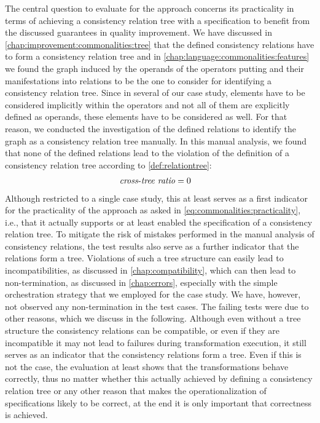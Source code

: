 The central question to evaluate for the \commonalities approach concerns its practicality in terms of achieving a consistency relation tree with a \commonalities specification to benefit from the discussed guarantees in quality improvement.
We have discussed in \autoref{chap:improvement:commonalities:tree} that the defined consistency relations have to form a consistency relation tree and in \autoref{chap:language:commonalities:features} we found the graph induced by the operands of the operators putting \commonalities and their manifestations into relations to be the one to consider for identifying a consistency relation tree.
Since in several \commonalities of our case study, elements have to be considered implicitly within the operators and not all of them are explicitly defined as operands, these elements have to be considered as well.
For that reason, we conducted the investigation of the defined relations to identify the graph as a consistency relation tree manually.
In this manual analysis, we found that none of the defined relations lead to the violation of the definition of a consistency relation tree according to \autoref{def:relationtree}:
\begin{align*}
    &
    \mathit{cross\mbox{-}tree\ ratio} = 0
\end{align*}
Although restricted to a single case study, this at least serves as a first indicator for the practicality of the approach as asked in \autoref{eq:commonalities:practicality}, i.e., that it actually supports or at least enabled the specification of a consistency relation tree.
To mitigate the risk of mistakes performed in the manual analysis of consistency relations, the test results also serve as a further indicator that the relations form a tree.
Violations of such a tree structure can easily lead to incompatibilities, as discussed in \autoref{chap:compatibility}, which can then lead to non-termination, as discussed in \autoref{chap:errors}, especially with the simple orchestration strategy that we employed for the case study.
We have, however, not observed any non-termination in the test cases.
The failing tests were due to other reasons, which we discuss in the following.
Although even without a tree structure the consistency relations can be compatible, or even if they are incompatible it may not lead to failures during transformation execution, it still serves as an indicator that the consistency relations form a tree.
Even if this is not the case, the evaluation at least shows that the transformations behave correctly, thus no matter whether this actually achieved by defining a consistency relation tree or any other reason that makes the operationalization of \commonalities specifications likely to be correct, at the end it is only important that correctness is achieved.

